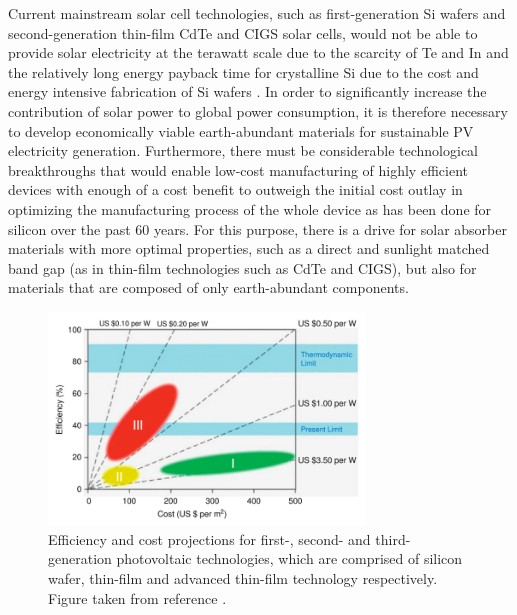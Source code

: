 Current mainstream solar cell technologies, such as first-generation Si wafers and second-generation thin-film CdTe and CIGS solar cells, would not be able to provide solar electricity at the terawatt scale due to the scarcity of Te and In and the relatively long energy payback time for crystalline Si due to the cost and energy intensive fabrication of Si wafers \cite{CZTS_vs_MAPI}. In order to significantly increase the contribution of solar power to global power consumption, it is therefore necessary to develop economically viable earth-abundant materials for sustainable PV electricity generation. Furthermore, there must be considerable technological breakthroughs that would enable low-cost manufacturing of highly efficient devices with enough of a cost benefit to outweigh the initial cost outlay in optimizing the manufacturing process of the whole device as has been done for silicon over the past 60 years. For this purpose, there is a drive for solar absorber materials with more optimal properties, such as a direct and sunlight matched band gap (as in thin-film technologies such as CdTe and CIGS), but also for materials that are composed of only earth-abundant components. 


\begin{figure}[h!]
  \centering
    \includegraphics[width=0.75\textwidth]{figures/PV_generations.png}
    \caption{Efficiency and cost projections for first-, second- and third-generation photovoltaic technologies, which are comprised of silicon wafer, thin-film and advanced thin-film technology respectively. Figure 
 taken from reference .}
  \label{PV_generations}
\end{figure}

